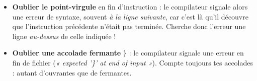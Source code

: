 \documentclass[11pt]{article}
\begin{document}
\begin{attention}
\begin{itemize}
\item \textbf{Oublier le point-virgule} en fin d'instruction : le compilateur signale alors une erreur de syntaxe, souvent \emph{à la ligne suivante}, car c'est là qu'il découvre que l'instruction précédente n'était pas terminée. Cherche donc l'erreur une ligne \emph{au-dessus} de celle indiquée !
\item \textbf{Oublier une accolade fermante} \texttt{\}} : le compilateur signale une erreur en fin de fichier (\emph{« expected '\}' at end of input »}). Compte toujours tes accolades : autant d'ouvrantes que de fermantes.
\end{itemize}
\end{attention}
\end{document}

